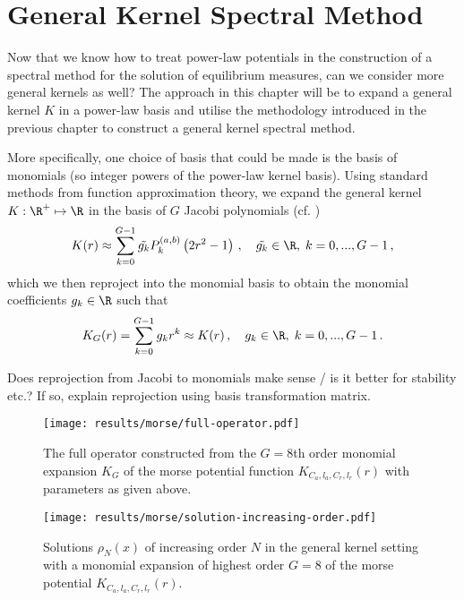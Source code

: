 \chapter{General Kernel Spectral Method}
\label{chap:general-kernel-spectral-method}

Now that we know how to treat power-law potentials in the construction of a spectral method for the solution of equilibrium measures, can we consider more general kernels as well?
The approach in this chapter will be to expand a general kernel $K$ in a power-law basis and utilise the methodology introduced in the previous chapter to construct a general kernel spectral method.

More specifically, one choice of basis that could be made is the basis of monomials (so integer powers of the power-law kernel basis).
Using standard methods from function approximation theory, we expand the general kernel $K: \R^+ \mapsto \R$ in the basis of $G$ Jacobi polynomials (cf. )
$$K(r) \approx \sum_{k=0}^{G-1} \tilde{g_k} P_k^{(a, b)}\left(2 r^2 - 1\right)\,, \quad \tilde{g_k} \in \R, \;k = 0, ..., G-1\,,$$
which we then reproject into the monomial basis to obtain the monomial coefficients $g_k \in \R$ such that
\begin{equation}
  K_G(r) = \sum_{k=0}^{G-1} g_k r^k \approx K(r)\,,\quad g_k \in \R, \;k=0, ..., G-1\,.
  \label{eq:monomial-expansion}
\end{equation}

Does reprojection from Jacobi to monomials make sense / is it better for stability etc.?
If so, explain reprojection using basis transformation matrix.

\begin{figure}[H]
  \centering
  \texttt{[image: results/morse/full-operator.pdf]}
  \caption[Full Morse operator]{The full operator constructed from the $G=8$th order monomial expansion $K_G$ of the morse potential function $K_{C_a, l_a, C_r, l_r}(r)$ with parameters as given above.}
  \label{fig:morse-operator}
\end{figure}

\begin{figure}[H]
  \centering
  \texttt{[image: results/morse/solution-increasing-order.pdf]}
  \caption[General kernel solutions of increasing order]{Solutions $\rho_N(x)$ of increasing order $N$ in the general kernel setting with a monomial expansion of highest order $G = 8$ of the morse potential $K_{C_a, l_a, C_r, l_r}(r)$.}
  \label{fig:morse-solution-increasing-order}
\end{figure}

